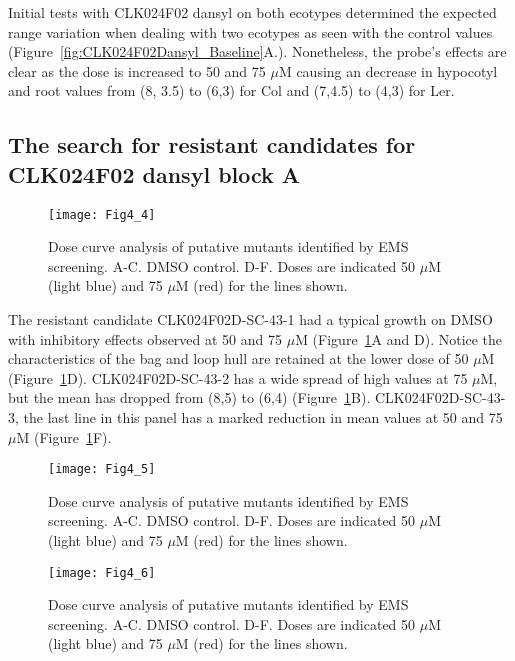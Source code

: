 Initial tests with CLK024F02 dansyl on both ecotypes determined the expected range variation when dealing with two ecotypes as seen with the control values (Figure~\ref{fig:CLK024F02Dansyl_Baseline}A.). Nonetheless, the probe's effects are clear as the dose is increased to 50 and 75 $\mu$M causing an decrease in hypocotyl and root values from (8, 3.5) to (6,3) for Col and (7,4.5) to (4,3) for Ler. 

\subsection{The search for resistant candidates for CLK024F02 dansyl block A}

\begin{figure}
\centering
\texttt{[image: Fig4\_4]}
\caption{Dose curve analysis of putative mutants identified by EMS screening. A-C. DMSO control. D-F. Doses are indicated 50 $\mu$M (light blue) and 75 $\mu$M (red) for the lines shown.} 
\label{fig:Fig4_4}
\end{figure}

The resistant candidate CLK024F02D-SC-43-1 had a typical growth on DMSO with inhibitory effects observed at 50 and 75 $\mu$M (Figure~\ref{fig:Fig4_4}A and D). Notice the characteristics of the bag and loop hull are retained at the lower dose of 50 $\mu$M (Figure~\ref{fig:Fig4_4}D). CLK024F02D-SC-43-2 has a wide spread of high values at 75 $\mu$M, but the mean has dropped from (8,5) to (6,4) (Figure~\ref{fig:Fig4_4}B). CLK024F02D-SC-43-3, the last line in this panel has a marked reduction in mean values at 50 and 75 $\mu$M (Figure~\ref{fig:Fig4_4}F).

\begin{figure}
\centering
\texttt{[image: Fig4\_5]}
\caption{Dose curve analysis of putative mutants identified by EMS screening. A-C. DMSO control. D-F. Doses are indicated 50 $\mu$M (light blue) and 75 $\mu$M (red) for the lines shown.} 
\label{fig:Fig4_5}
\end{figure}

\begin{figure}
\centering
\texttt{[image: Fig4\_6]}
\caption{Dose curve analysis of putative mutants identified by EMS screening. A-C. DMSO control. D-F. Doses are indicated 50 $\mu$M (light blue) and 75 $\mu$M (red) for the lines shown.} 
\label{fig:Fig4_6}
\end{figure}


